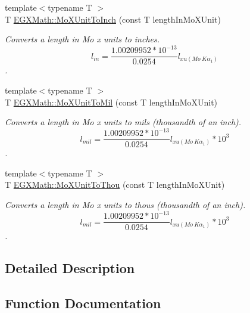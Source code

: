 \begin{DoxyCompactItemize}
{\footnotesize template$<$typename T $>$ }\\T \mbox{\hyperlink{group___e_g_x_math-_conversions-_length_conversions-_non-_s_i-_mo_x_unit-_imperial_ga98ea06a1705222e038de1b19f8bfbe4b}{E\+G\+X\+Math\+::\+Mo\+X\+Unit\+To\+Inch}} (const T length\+In\+Mo\+X\+Unit)
\begin{DoxyCompactList}\small\item\em Converts a length in Mo x units to inches. \[ l_{in}= \frac{1.00209952*10^{-13}}{0.0254} l_{xu(Mo\ K\alpha_1)} \]. \end{DoxyCompactList}\item 
{\footnotesize template$<$typename T $>$ }\\T \mbox{\hyperlink{group___e_g_x_math-_conversions-_length_conversions-_non-_s_i-_mo_x_unit-_imperial_gaa73c49ecabd4f9db771fac592ff7449a}{E\+G\+X\+Math\+::\+Mo\+X\+Unit\+To\+Mil}} (const T length\+In\+Mo\+X\+Unit)
\begin{DoxyCompactList}\small\item\em Converts a length in Mo x units to mils (thousandth of an inch). \[ l_{mil}= \frac{1.00209952*10^{-13}}{0.0254} l_{xu(Mo\ K\alpha_1)} * 10^{3} \]. \end{DoxyCompactList}\item 
{\footnotesize template$<$typename T $>$ }\\T \mbox{\hyperlink{group___e_g_x_math-_conversions-_length_conversions-_non-_s_i-_mo_x_unit-_imperial_gae18fc1fb7d5238fe185b85084b95b2b0}{E\+G\+X\+Math\+::\+Mo\+X\+Unit\+To\+Thou}} (const T length\+In\+Mo\+X\+Unit)
\begin{DoxyCompactList}\small\item\em Converts a length in Mo x units to thous (thousandth of an inch). \[ l_{mil}= \frac{1.00209952*10^{-13}}{0.0254} l_{xu(Mo\ K\alpha_1)} * 10^{3} \]. \end{DoxyCompactList}\end{DoxyCompactItemize}


\subsection{Detailed Description}


\subsection{Function Documentation}
\mbox{\label{group___e_g_x_math-_conversions-_length_conversions-_non-_s_i-_mo_x_unit-_imperial_ga4ea603df9560a6bba1fc18f36becdf00}} 
